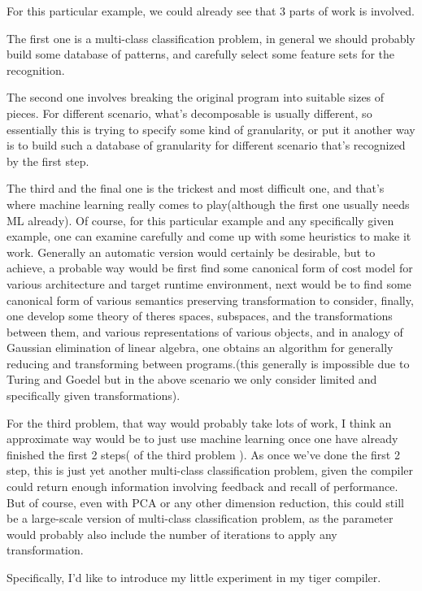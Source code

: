 \documentclass[a4paper]{article}
\begin{document}
For this particular example, we could already see that 3 parts of work is involved.

The first one is a multi-class classification problem, in general we should probably build 
some database of patterns, and carefully select some feature sets for the recognition.

The second one involves breaking the original program into suitable sizes of pieces.
For different scenario, what's decomposable is usually different, so essentially this is
trying to specify some kind of granularity, or put it another way is to build such a 
database of granularity for different scenario that's recognized by the first step.

The third and the final one is the trickest and most difficult one, and that's where machine
learning really comes to play(although the first one usually needs ML already).
Of course, for this particular example and any specifically given example, one can examine
carefully and come up with some heuristics to make it work.
Generally an automatic version would certainly be desirable, but to achieve, a probable way would be first find
some canonical form of cost model for various architecture and target runtime environment,
next would be to find some canonical form of various semantics preserving transformation to consider,
finally, one develop some theory of theres spaces, subspaces, and the transformations between them, and
various representations of various objects, and in analogy of Gaussian elimination of linear algebra,
one obtains an algorithm for generally reducing and transforming between programs.(this generally is impossible
due to Turing and Goedel but in the above scenario we only consider limited and specifically given transformations).

For the third problem, that way would probably take lots of work, I think an approximate way would be to just use
machine learning once one have already finished the first 2 steps( of the third problem ). As once we've done
the first 2 step, this is just yet another multi-class classification problem, given
the compiler could return enough information involving feedback and recall of performance.
But of course, even with PCA or any other dimension reduction, this could still be a large-scale
version of multi-class classification problem, as the parameter would probably also include the 
number of iterations to apply any transformation.

Specifically, I'd like to introduce my little experiment in my tiger compiler.
\end{document}
